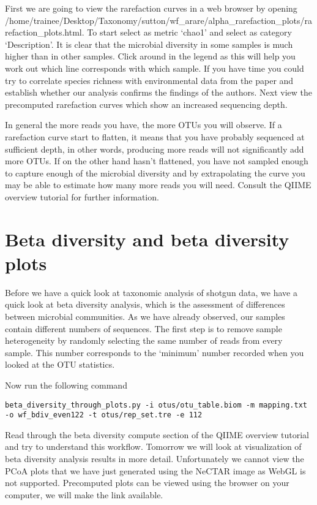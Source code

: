 First we are going to view the rarefaction curves in a web browser by opening /home/trainee/Desktop/Taxonomy/sutton/wf_arare/alpha_rarefaction_plots/rarefaction_plots.html. 
To start select as metric ‘chao1’ and select as category ‘Description’. It is clear that the microbial diversity in some samples is much higher than in other samples. Click around in the legend as this will help you work out which line corresponds with which sample. If you have time you could try to correlate species richness with environmental data from the paper and establish whether our analysis confirms the findings of the authors.
Next view the precomputed rarefaction curves which show an increased sequencing depth.

In general the more reads you have, the more OTUs you will observe. If a rarefaction curve start to flatten, it means that you have probably sequenced at sufficient depth, in other words, producing more reads will not significantly add more OTUs. If on the other hand hasn’t flattened, you have not sampled enough to capture enough of the microbial diversity and by extrapolating the curve you may be able to estimate how many more reads you will need. Consult the QIIME overview tutorial for further information.

\section{Beta diversity and beta diversity plots}

Before we have a quick look at taxonomic analysis of shotgun data, we have a quick look at beta diversity analysis, which is the assessment of differences between microbial communities. As we have already observed, our samples contain different numbers of sequences. 
The first step is to remove sample heterogeneity by randomly selecting the same number of reads from every sample. This number corresponds to the ‘minimum’ number recorded when you looked at the OTU statistics. 

\begin{steps}
Now run the following command
\begin{lstlisting}
beta_diversity_through_plots.py -i otus/otu_table.biom -m mapping.txt -o wf_bdiv_even122 -t otus/rep_set.tre -e 112

\end{lstlisting}
\end{steps}

Read through the beta diversity compute section of the QIIME overview tutorial and try to understand this workflow. Tomorrow we will look at visualization of beta diversity analysis results in more detail. Unfortunately we cannot view the PCoA plots that we have just generated using the NeCTAR image as WebGL is not supported. Precomputed plots can be viewed using the browser on your computer, we will make the link available.

